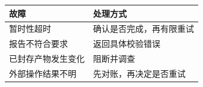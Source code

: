 \begin{tabular}{@{}P{4.0cm}P{8.5cm}@{}}
\toprule
\textbf{故障} & \textbf{处理方式} \\
\midrule
暂时性超时 & 确认是否完成，再有限重试 \\
报告不符合要求 & 返回具体校验错误 \\
已封存产物发生变化 & 阻断并调查 \\
外部操作结果不明 & 先对账，再决定是否重试 \\
\bottomrule
\end{tabular}

